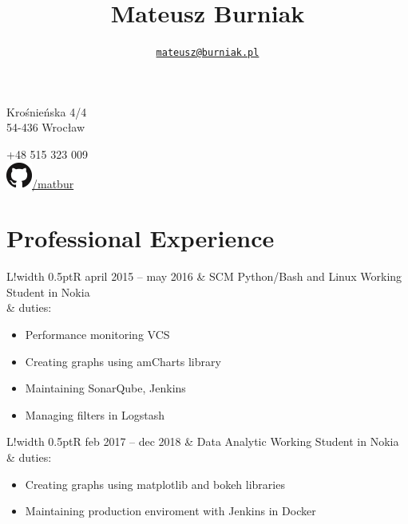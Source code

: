 \documentclass{article}
\title{\bf\Huge Mateusz Burniak}
\author{\href{mailto:mateusz@burniak.pl}{\nolinkurl{mateusz@burniak.pl}}}
\date{}
\newcommand\VRule{\color{lightgray}\vrule width 0.5pt}
\begin{document}
\maketitle
\thispagestyle{fancy}

\begin{minipage}[ht]{.5\textwidth}
\centering
Krośnieńska 4/4 \\
54-436 Wrocław
\end{minipage}
\begin{minipage}[ht]{.5\textwidth}
\centering
+48 515 323 009\\
\href{https://github.com/matbur}{\includegraphics[scale=.3]{github.png}/matbur}\\
\end{minipage}

\vspace{1em}

\section*{Professional Experience}
\begin{tabular}{L!{\VRule}R}
april 2015 -- may 2016 & SCM Python/Bash and Linux Working Student in Nokia \\
& duties:
\begin{itemize}
\item Performance monitoring VCS
\item Creating graphs using amCharts library
\item Maintaining SonarQube, Jenkins
\item Managing filters in Logstash
\end{itemize}
\end{tabular}

\noindent
\begin{tabular}{L!{\VRule}R}
feb 2017 -- dec 2018 & Data Analytic Working Student in Nokia \\
& duties:
\begin{itemize}
\item Creating graphs using matplotlib and bokeh libraries
\item Maintaining production enviroment with Jenkins in Docker
\end{itemize}

\end{tabular}
\end{document}

